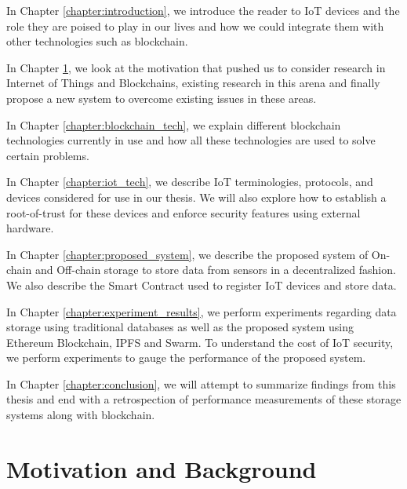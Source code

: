 \documentclass[11pt,openright]{report}
\begin{document}
In Chapter \ref{chapter:introduction}, we introduce the reader to IoT
devices and the role they are poised to play in our lives and how we
could integrate them with other technologies such as blockchain.\newline

\noindent In Chapter \ref{chapter:background}, we look at the motivation
that pushed us to consider research in Internet of Things and
Blockchains, existing research in this arena and finally propose a new
system to overcome existing issues in these areas. \newline

\noindent In Chapter \ref{chapter:blockchain_tech}, we explain different
blockchain technologies currently in use and how all these technologies
are used to solve certain problems. \newline

\noindent In Chapter \ref{chapter:iot_tech}, we describe IoT
terminologies, protocols, and devices considered for use in our thesis.
We will also explore how to establish a root-of-trust for these devices
and enforce security features using external hardware. \newline

\noindent In Chapter \ref{chapter:proposed_system}, we describe the
proposed system of On-chain and Off-chain storage to store data from
sensors in a decentralized fashion. We also describe the Smart Contract
used to register IoT devices and store data.\newline

\noindent In Chapter \ref{chapter:experiment_results}, we perform
experiments regarding data storage using traditional databases as well as
the proposed system using Ethereum Blockchain, IPFS and Swarm. To
understand the cost of IoT security, we perform experiments to gauge the
performance of the proposed system.\newline

\noindent In Chapter \ref{chapter:conclusion}, we will attempt to
summarize findings from this thesis and end with a retrospection of
performance measurements of these storage systems along with
blockchain.\newline

\chapter{Motivation and Background} \label{chapter:background}
\end{document}
